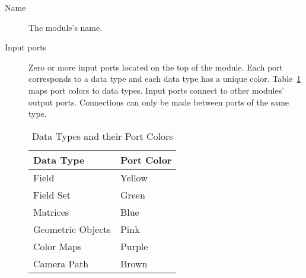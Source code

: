 \begin{description}
\item[Name] The module's name.
\item[Input ports] Zero or more input ports located on the top of the
  module.  Each port corresponds to a data type and each data type has a
  unique color.  Table~\ref{tab:portcolors} maps port colors to data types.
  Input ports connect to other modules' output ports.  Connections can only
  be made between ports of the same type.

  \begin{table}[htbp]
    \begin{center}
      \begin{tabular}{|l|l|}
        \hline
        \textbf{Data Type} & \textbf{Port Color} \\
        \hline
        Field & Yellow \\
        Field Set & Green \\
        Matrices & Blue \\
        Geometric Objects & Pink \\
        Color Maps & Purple \\
        Camera Path & Brown \\
        \hline
      \end{tabular}
      \caption{Data Types and their Port Colors}
      \label{tab:portcolors}
    \end{center}
  \end{table}


\end{description}
